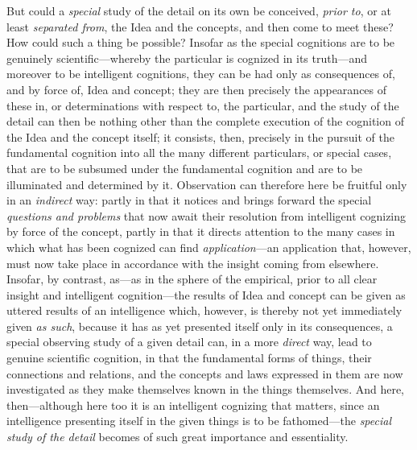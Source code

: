 \documentclass[12pt,a4paper]{book}
\begin{document}
But could a \emph{special} study of the detail on its own be conceived, \emph{prior to}, or at
least \emph{separated from}, the Idea and the concepts, and then come to meet these? How
could such a thing be possible? Insofar as the special cognitions are to be genuinely
scientific---whereby the particular is cognized in its truth---and moreover to be
intelligent cognitions, they can be had only as consequences of, and by force of, Idea and
concept; they are then precisely the appearances of these in, or determinations with
respect to, the particular, and the study of the detail can then be nothing other than the
complete execution of the cognition of the Idea and the concept itself; it consists, then,
precisely in the pursuit of the fundamental cognition into all the many different
particulars, or special cases, that are to be subsumed under the fundamental cognition and
are to be illuminated and determined by it. Observation can therefore here be fruitful only
in an \emph{indirect} way: partly in that it notices and brings forward the special
\emph{questions and problems} that now await their resolution from intelligent cognizing by
force of the concept, partly in that it directs attention to the many cases in which what
has been cognized can find \emph{application}---an application that, however, must now take
place in accordance with the insight coming from elsewhere. Insofar, by contrast, as---as
in the sphere of the empirical, prior to all clear insight and intelligent cognition---the
results of Idea and concept can be given as uttered results of an intelligence which,
however, is thereby not yet immediately given \emph{as such}, because it has as yet presented
itself only in its consequences, a special observing study of a given detail can, in a more
\emph{direct} way, lead to genuine scientific cognition, in that the fundamental forms of
things, their connections and relations, and the concepts and laws expressed in them are
now investigated as they make themselves known in the things themselves. And here,
then---although here too it is an intelligent cognizing that matters, since an intelligence
presenting itself in the given things is to be fathomed---the \emph{special study of the
detail} becomes of such great importance and essentiality.
\end{document}
